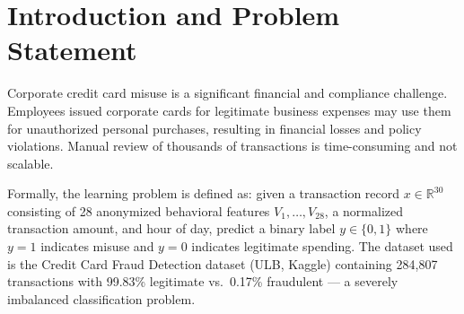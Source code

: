\documentclass{article}
\begin{document}

\begin{abstract}
Corporate credit card misuse is a significant financial and compliance
challenge in enterprise settings. This paper presents an end-to-end
machine learning system for detecting fraudulent corporate card
transactions, combining a full ETL pipeline (PostgreSQL, Apache Airflow)
with a five-model comparison (Logistic Regression, LinearSVC, Random
Forest, XGBoost, LightGBM). We use the ULB Credit Card Fraud Detection
dataset (284,807 transactions, 0.17\% fraud) and address severe class
imbalance using SMOTE and \texttt{class\_weight=`balanced'}. Random
Forest achieves the best performance with AUC-ROC 0.9845, Precision 0.86,
and F1-score 0.84, producing only 13 false positives on the test set.
Results are served through a FastAPI backend with six REST endpoints and
visualized in a React dashboard.
\end{abstract}

\section{Introduction and Problem Statement}

Corporate credit card misuse is a significant financial and compliance
challenge. Employees issued corporate cards for legitimate business
expenses may use them for unauthorized personal purchases, resulting in
financial losses and policy violations. Manual review of thousands of
transactions is time-consuming and not scalable.

Formally, the learning problem is defined as: given a transaction record
$x \in \mathbb{R}^{30}$ consisting of 28 anonymized behavioral features
$V_1, \ldots, V_{28}$, a normalized transaction amount, and hour of day,
predict a binary label $y \in \{0, 1\}$ where $y = 1$ indicates misuse
and $y = 0$ indicates legitimate spending. The dataset used is the Credit
Card Fraud Detection dataset (ULB, Kaggle) containing 284,807 transactions
with 99.83\% legitimate vs.\ 0.17\% fraudulent --- a severely imbalanced
classification problem.
\end{document}
